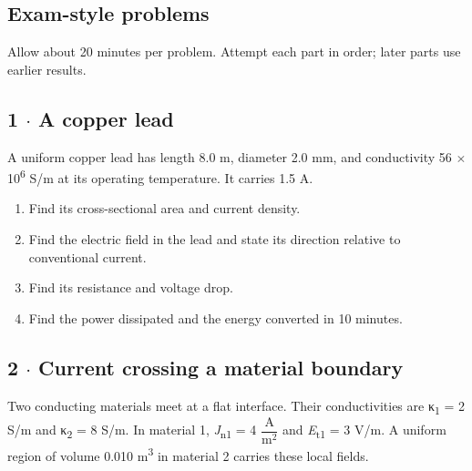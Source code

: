 \documentclass[11pt]{article}
\begin{document}
\begin{keepsection}
\section{Exam-style problems}

Allow about 20 minutes per problem. Attempt each part in order; later parts use earlier results.

\begin{keepsection}
\subsection{1 \ensuremath{\cdot} A copper lead}

A uniform copper lead has length 8.0 m, diameter 2.0 mm, and conductivity 56 \ensuremath{\times} 10\textsuperscript{6} S/m at its operating temperature. It carries 1.5 A.

\begin{enumerate}
\item Find its cross-sectional area and current density.
\item Find the electric field in the lead and state its direction relative to conventional current.
\item Find its resistance and voltage drop.
\item Find the power dissipated and the energy converted in 10 minutes.
\end{enumerate}

\end{keepsection}

\begin{keepsection}
\subsection{2 \ensuremath{\cdot} Current crossing a material boundary}

Two conducting materials meet at a flat interface. Their conductivities are κ\textsubscript{1} = 2 S/m and κ\textsubscript{2} = 8 S/m. In material 1, \textit{J}\textsubscript{n1} = 4 {\small\ensuremath{\dfrac{\mathrm{A}}{\mathrm{m}^{2}}}} and \textit{E}\textsubscript{t1} = 3 V/m. A uniform region of volume 0.010 m\textsuperscript{3} in material 2 carries these local fields.


\end{keepsection}
\end{keepsection}
\end{document}
